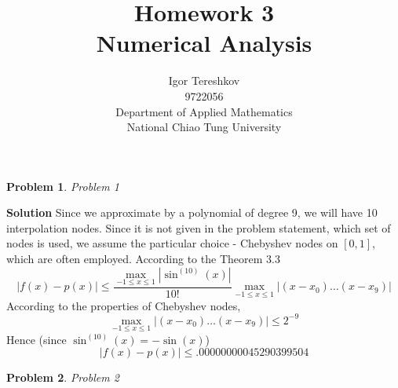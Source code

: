 \documentclass[8pt]{article} %
\title{Homework 3\\
Numerical Analysis}
\author{Igor Tereshkov\\9722056\\Department of Applied Mathematics\\National Chiao Tung University}
\newtheorem{prob}{Problem}
\newenvironment{solution}%
{\par\textbf{Solution}\space }%
{\par}
\begin{document}
\begin{CJK}{UTF8}{bsmi}
\maketitle
\end{CJK}

\begin{prob}Problem 1\end{prob}
\begin{solution}
	Since we approximate by a polynomial of degree 9, we will have 10 interpolation nodes. Since it is not given in the problem statement,
	which set of nodes is used, we assume the particular choice - Chebyshev nodes on $[0,1]$, which are often employed.
	According to the Theorem 3.3
	\[|f(x)-p(x)|\leq \frac{\max_{-1\leq x\leq 1} |\sin^{(10)}(x)|}{10!}\max_{-1\leq x\leq 1}|(x-x_0)\dots(x-x_9)|\]
	According to the properties of Chebyshev nodes,
	\[\max_{-1\leq x\leq 1}|(x-x_0)\dots(x-x_9)|\leq 2^{-9}\]
	Hence (since $\sin^{(10)}(x)=-\sin(x)$)
	\[|f(x)-p(x)|\leq .00000000045290399504\]
\end{solution}
\begin{prob}Problem 2\end{prob}
\end{document}
